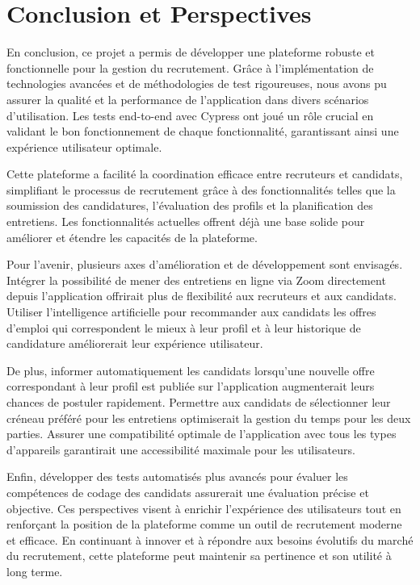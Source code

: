 \chapter*{Conclusion et Perspectives}




En conclusion, ce projet a permis de développer une plateforme robuste et fonctionnelle pour la gestion du recrutement. Grâce à l'implémentation de technologies avancées et de méthodologies de test rigoureuses, nous avons pu assurer la qualité et la performance de l'application dans divers scénarios d'utilisation. Les tests end-to-end avec Cypress ont joué un rôle crucial en validant le bon fonctionnement de chaque fonctionnalité, garantissant ainsi une expérience utilisateur optimale.
\newline

Cette plateforme a facilité la coordination efficace entre recruteurs et candidats, simplifiant le processus de recrutement grâce à des fonctionnalités telles que la soumission des candidatures, l'évaluation des profils et la planification des entretiens. Les fonctionnalités actuelles offrent déjà une base solide pour améliorer et étendre les capacités de la plateforme.
\newline

Pour l'avenir, plusieurs axes d'amélioration et de développement sont envisagés. Intégrer la possibilité de mener des entretiens en ligne via Zoom directement depuis l'application offrirait plus de flexibilité aux recruteurs et aux candidats. Utiliser l'intelligence artificielle pour recommander aux candidats les offres d'emploi qui correspondent le mieux à leur profil et à leur historique de candidature améliorerait leur expérience utilisateur.
\newline

De plus, informer automatiquement les candidats lorsqu'une nouvelle offre correspondant à leur profil est publiée sur l'application augmenterait leurs chances de postuler rapidement. Permettre aux candidats de sélectionner leur créneau préféré pour les entretiens optimiserait la gestion du temps pour les deux parties. Assurer une compatibilité optimale de l'application avec tous les types d'appareils garantirait une accessibilité maximale pour les utilisateurs.
\newline

Enfin, développer des tests automatisés plus avancés pour évaluer les compétences de codage des candidats assurerait une évaluation précise et objective. Ces perspectives visent à enrichir l'expérience des utilisateurs tout en renforçant la position de la plateforme comme un outil de recrutement moderne et efficace. En continuant à innover et à répondre aux besoins évolutifs du marché du recrutement, cette plateforme peut maintenir sa pertinence et son utilité à long terme.
